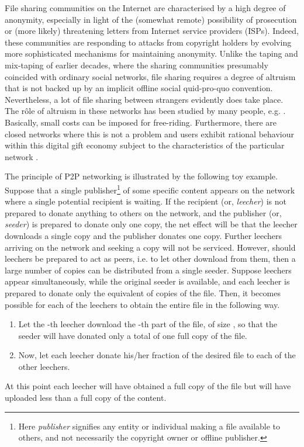 \documentclass[12pt,english]{apa6}
\begin{document}
File sharing communities on the Internet are characterised by a high
degree of anonymity, especially in light of the (somewhat remote)
possibility of prosecution or (more likely) threatening letters from
Internet service providers (ISPs). Indeed, these communities are responding
to attacks from copyright holders by evolving more sophisticated mechanisms
for maintaining anonymity. Unlike the taping and mix-taping of earlier
decades, where the sharing communities presumably coincided with ordinary
social networks, file sharing requires a degree of altruism that is
not backed up by an implicit offline social quid-pro-quo convention. Nevertheless,
a lot of file sharing between strangers evidently does take place.
The rôle of altruism in these networks has been studied by many people,
e.g. \citet{feldman_free-riding_2006}. Basically, small costs can
be imposed for free-riding. Furthermore, there are closed networks
where this is not a problem and users exhibit rational behaviour within
this‭ ‬digital gift economy \citep{becker_dynamics_2006} subject
to the characteristics of the particular network‭ \citep{feldman_free-riding_2006}‬.‭ 

The principle of P2P networking is illustrated by the following toy
example. Suppose that a single publisher\footnote{Here \emph{publisher} signifies any entity or individual making a
file available to others, and not necessarily the copyright owner
or offline publisher.} of some specific content appears on the network where a single potential
recipient is waiting. If the recipient (or, \emph{leecher}) is not
prepared to donate anything to others on the network, and the publisher
(or, \emph{seeder}) is prepared to donate only one copy, the net effect
will be that the leecher downloads a single copy and the publisher
donates one copy. Further leechers arriving on the network and seeking
a copy will not be serviced. However, should leechers be prepared
to act as peers, i.e. to let other download from them, then a large
number of copies can be distributed from a single seeder. Suppose
 leechers appear simultaneously, while the original seeder is
available, and each leecher is prepared to donate only the equivalent
of  copies of the file. Then, it becomes possible
for each of the leechers to obtain the entire file in the following
way.
\begin{enumerate}
\item Let the -th leecher download the -th part of the file, of
size , so that the seeder will have donated only a total
of one full copy of the file.
\item Now, let each leecher donate his/her fraction  of the
desired file to each of the  other leechers.
\end{enumerate}
At this point each leecher will have obtained a full copy of the file
but will have uploaded less than a full copy of the content.
\end{document}
